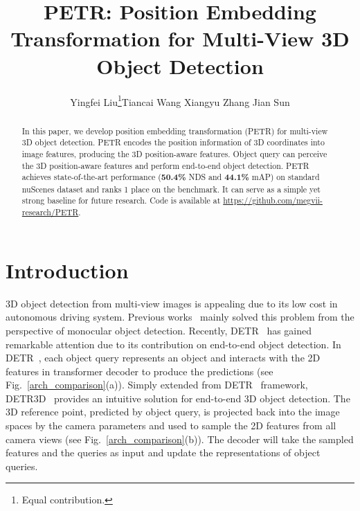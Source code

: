 \documentclass[runningheads]{llncs}
\begin{document}
\pagestyle{headings}
\mainmatter
\def\ECCVSubNumber{4420}  

\title{PETR: Position Embedding Transformation for Multi-View 3D Object Detection} 

\begin{comment}
\titlerunning{ECCV-22 submission ID \ECCVSubNumber} 
\authorrunning{ECCV-22 submission ID \ECCVSubNumber} 
\author{Anonymous ECCV submission}
\institute{Paper ID \ECCVSubNumber}
\end{comment}


\author{Yingfei Liu\thanks{Equal contribution.}\qquad Tiancai Wang \qquad Xiangyu Zhang \qquad Jian Sun
}




\maketitle

\begin{abstract}
In this paper, we develop position embedding transformation (PETR) for multi-view 3D object detection. PETR encodes the position information of 3D coordinates into image features, producing the 3D position-aware features. Object query can perceive the 3D position-aware features and perform end-to-end object detection. PETR achieves state-of-the-art performance (\textbf{50.4\%} NDS and \textbf{44.1\%} mAP) on standard nuScenes dataset and ranks 1 place on the benchmark. It can serve as a simple yet strong baseline for future research.
Code is available at \url{https://github.com/megvii-research/PETR}.
\end{abstract}

\section{Introduction}
3D object detection from multi-view images is appealing due to its low cost in autonomous driving system. Previous works~\cite{chen2016monocular,mousavian20173d,wang2021fcos3d,park2021dd3d,wang2022pgd} mainly solved this problem from the perspective of monocular object detection. Recently, DETR~\cite{carion2020detr} has gained remarkable attention due to its contribution on end-to-end object detection. In DETR~\cite{carion2020detr}, each object query represents an object and interacts with the 2D features in transformer decoder to produce the predictions (see Fig.~\ref{arch_comparison}(a)).
Simply extended from DETR~\cite{carion2020detr} framework, DETR3D~\cite{wang2022detr3d} provides an intuitive solution for end-to-end 3D object detection. The 3D reference point, predicted by object query, is projected back into the image spaces by the camera parameters and used to sample the 2D features from all camera views (see Fig.~\ref{arch_comparison}(b)). The decoder will take the sampled features and the queries as input and update the representations of object queries.
\end{document}
